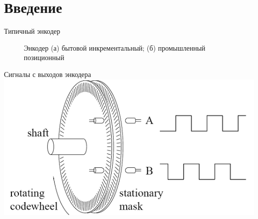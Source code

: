 \frame{\titlepage}
{
}

\section{Введение}

\begin{frame}{Типичный энкодер}
    \centering
    \begin{figure}[ht]
        \qquad
        \caption{Энкодер (а) бытовой инкрементальный; (б) промышленный позиционный}
    \end{figure}
\end{frame}

\begin{frame}{Сигналы с выходов энкодера}
    \centering
    \includegraphics[width=.8\linewidth]{../Figures/meandr.png}
\end{frame}

